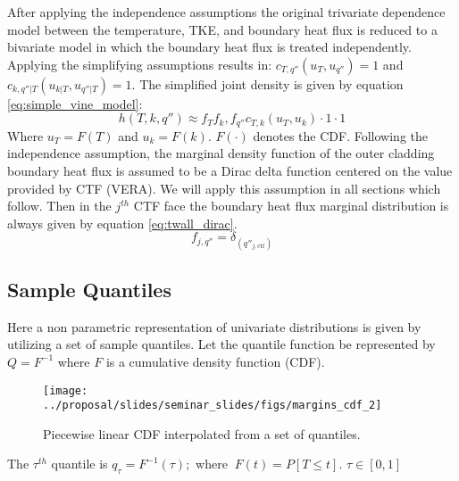 After applying the independence assumptions the original trivariate dependence model between the temperature, TKE, and boundary heat flux is reduced to a bivariate model in which the boundary heat flux is treated independently.  Applying the simplifying assumptions results in: $c_{T,q''}(u_T, u_{q''}) = 1$ and $c_{k,q''|T}(u_{k|T}, u_{q''|T}) = 1$. The simplified joint density is given by equation \ref{eq:simple_vine_model}:
\begin{equation}
h(T, k, q'') \approx  f_T f_k, f_{q''} c_{T,k}(u_{T}, u_{k})  \cdot 1 \cdot 1
\label{eq:simple_vine_model}
\end{equation}
Where $u_T=F(T)$ and $u_k = F(k)$. $F(\cdot)$ denotes the CDF.
Following the independence assumption, the marginal density function of the outer cladding boundary heat flux is assumed to be a Dirac delta function centered on the value provided by CTF (VERA).  We will apply this assumption in all sections which follow.
Then in the $j^{th}$ CTF face the boundary heat flux marginal distribution is always given by equation \ref{eq:twall_dirac}.
\begin{equation}
f_{j,q''} = \delta_{(q''_{j, \mathrm{ctf}})}
\label{eq:twall_dirac}
\end{equation}





\subsection{Sample Quantiles}
\label{chap:quantiles}

Here a non parametric representation of univariate distributions is given by utilizing a set of sample quantiles.
Let the quantile function be represented by $Q=F^{-1}$ where $F$ is a cumulative density function (CDF).

\begin{figure}[H]
    \centering
    \texttt{[image: ../proposal/slides/seminar\_slides/figs/margins\_cdf\_2]}
    \caption[CDF from quantiles.]{Piecewise linear CDF interpolated from a set of quantiles.}
    \label{fig:marginscdf2}
\end{figure}

The $\tau^{th}$ quantile is $q_\tau = F^{-1}(\tau); $ where $\ F(t)=P[T \leq t]$.
$\tau \in [0, 1]$

